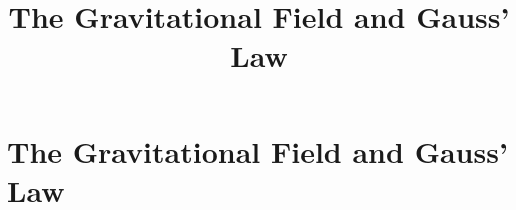 \documentclass[aspectratio=169,
hyperref={colorlinks,urlcolor=blue}
]{beamer}
\begin{document}

\section{The Gravitational Field and Gauss' Law}
\label{sec:gravfieldandgauss}
\title{The Gravitational Field and Gauss' Law}
\author{\insertsubsection}


\begin{frame}
\titlepage
\thispagestyle{empty}
\end{frame}









\end{document}
